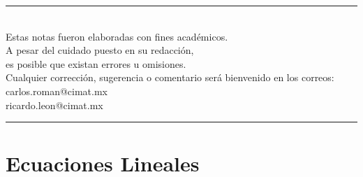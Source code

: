 \documentclass[12pt,a4paper]{book}
\begin{document}
    \begin{center}
        \rule{0.85\linewidth}{0.4pt}\\[10pt]
        \small
        Estas notas fueron elaboradas con fines académicos.\\
        A pesar del cuidado puesto en su redacción,\\
        es posible que existan errores u omisiones.\\[0.3cm]

        Cualquier corrección, sugerencia o comentario será bienvenido
        en los correos: \\[0.3cm]

        carlos.roman@cimat.mx\\
        ricardo.leon@cimat.mx\\[10pt]
        \rule{0.85\linewidth}{0.4pt}
    \end{center}

    
    \setcounter{page}{1}
    \tableofcontents
    
    
    \chapter{Ecuaciones Lineales}
    
\end{document}
